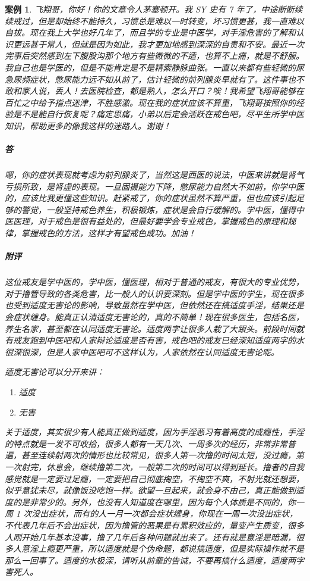 \documentclass{ctexart}
\newtheorem{case}{案例}
\begin{document}
\begin{case}
    飞翔哥，你好！你的文章令人茅塞顿开。我 SY 史有 7 年了，中途断断续续戒过，但是却始终不能持久，习惯总是难以一时转变，坏习惯更甚，我一直难以自拔。现在我上大学也好几年了，而且学的专业是中医学，对手淫危害的了解和认识更远甚于常人，但就是因为如此，我才更加地感到深深的自责和不安。最近一次完事后突然感到左下腹股沟那个地方有些微微的不适，也算不上痛，就是不舒服。我自己也是学医的，但是不能肯定是不是精索静脉曲张。一直以来都有些轻微的尿急尿频症状，憋尿能力远不如从前了，估计轻微的前列腺炎早就有了。这件事也不敢和家人说，丢人！去医院检查，都是熟人，怎么开口？唉！我希望飞翔哥能够在百忙之中给予指点迷津，不胜感激。现在我的症状应该不算重，飞翔哥按照你的经验是不是能自行恢复呢？痛定思痛，小弟以后定会活跃在戒色吧，尽平生所学中医知识，帮助更多的像我这样的迷路人。谢谢！
    \subparagraph{答} 嗯，你的症状表现就考虑为前列腺炎了，当然这是西医的说法，中医来讲就是肾气亏损所致，是肾虚的表现。一旦固摄能力下降，憋尿能力自然大不如前，你学中医的，应该比我更懂这些知识。赶紧戒了，你的症状虽然不算严重，但也应该引起足够的警觉，一般坚持戒色养生，积极锻炼，症状是会自行缓解的。学中医，懂得中医医理，对于戒色是很有益处的，但最好要学会专业戒色，掌握戒色的原理和规律，掌握戒色的方法，这样才有望戒色成功。加油！
    \subparagraph{附评} 这位戒友是学中医的，学中医，懂医理，相对于普通的戒友，有很大的专业优势，对于撸管导致的各类危害，比一般人的认识要深刻。但是学中医的学生，现在很多也受到适度无害论的影响，导致虽然在学中医，但依然还在搞适度手淫，结果还是会症状缠身。能真正认清适度无害论的，真的不简单！现在很多医生，包括名医，养生名家，甚至都在认同适度无害论。适度两字让很多人栽了大跟头。前段时间就有戒友跑到中医吧和人家辩论适度是否有害，戒色吧的戒友已经深知适度两字的水很深很深，但是人家中医吧可不这样认为，人家依然在认同适度无害论呢。

    适度无害论可以分开来讲：

    \begin{multicols}{2}
        \begin{enumerate}
            \item 适度
            \item 无害
        \end{enumerate}
    \end{multicols}

    关于适度，其实很少有人能真正做到适度，因为手淫恶习有着高度的成瘾性，手淫的特点就是一发不可收拾，很多人都有一天几次、一周多次的经历，非常非常普遍，甚至连续射两次的情形也比较常见，很多人第一次撸的时间太短，没过瘾，第一次射完，休息会，继续撸第二次，一般第二次的时间可以得到延长。撸者的自我感觉就是一定要过足瘾，一定要把自己彻底掏空，不掏空不爽，不射光就还想要，似乎意犹未尽，就像饭没吃饱一样。欲望一旦起来，就会身不由己，真正能做到适度的是非常少的。另外，也没有人知道度在哪里，因为每个人体质是不同的，你一周 1 次没出症状，而有的人一月一次都会症状缠身，你现在一周一次没出症状，不代表几年后不会出症状，因为撸管的恶果是有累积效应的，量变产生质变，很多人刚开始几年基本没事，撸了几年后各种问题就出来了。还有就是意淫是暗漏，很多人意淫上瘾更严重，所以适度就是个伪命题，都说搞适度，但是实际操作就不是那么一回事了。适度的水极深，请听从前辈的告诫，不要再搞什么适度，适度两字害死人。


\end{case}
\end{document}
